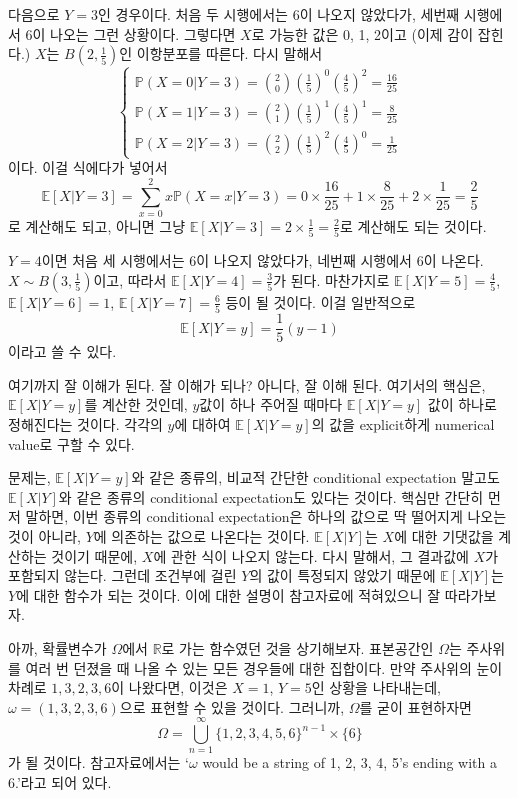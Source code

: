 \documentclass{article}
\begin{document}
다음으로 \(Y=3\)인 경우이다.
처음 두 시행에서는 6이 나오지 않았다가, 세번째 시행에서 6이 나오는 그런 상황이다.
그렇다면 \(X\)로 가능한 값은 0, 1, 2이고 (이제 감이 잡힌다.) \(X\)는 \(B(2,\frac15)\)인 이항분포를 따른다.
다시 말해서
\[\begin{cases}
\mathbb P(X=0|Y=3)=\binom20\left(\frac15\right)^0\left(\frac45\right)^2=\frac{16}{25}\\
\mathbb P(X=1|Y=3)=\binom21\left(\frac15\right)^1\left(\frac45\right)^1=\frac8{25}\\
\mathbb P(X=2|Y=3)=\binom22\left(\frac15\right)^2\left(\frac45\right)^0=\frac1{25}
\end{cases}\]
이다.
이걸 식에다가 넣어서
\[\mathbb E[X|Y=3]=\sum_{x=0}^2x\mathbb P(X=x|Y=3)=0\times\frac{16}{25}+1\times\frac8{25}+2\times\frac1{25}=\frac25\]
로 계산해도 되고, 아니면 그냥 \(\mathbb E[X|Y=3]=2\times\frac15=\frac25\)로 계산해도 되는 것이다.

\(Y=4\)이면 처음 세 시행에서는 6이 나오지 않았다가, 네번째 시행에서 6이 나온다.
\(X\sim B(3,\frac15)\)이고, 따라서 \(\mathbb E[X|Y=4]=\frac35\)가 된다.
마찬가지로 \(\mathbb E[X|Y=5]=\frac45\), \(\mathbb E[X|Y=6]=1\), \(\mathbb E[X|Y=7]=\frac65\) 등이 될 것이다.
이걸 일반적으로
\[\mathbb E[X|Y=y]=\frac15(y-1)\]
이라고 쓸 수 있다.

여기까지 잘 이해가 된다.
잘 이해가 되나?
아니다, 잘 이해 된다.
여기서의 핵심은, \(\mathbb E[X|Y=y]\)를 계산한 것인데, \(y\)값이 하나 주어질 때마다 \(\mathbb E[X|Y=y]\) 값이 하나로 정해진다는 것이다.
각각의 \(y\)에 대하여 \(\mathbb E[X|Y=y]\)의 값을 explicit하게 numerical value로 구할 수 있다.

문제는, \(\mathbb E[X|Y=y]\)와 같은 종류의, 비교적 간단한 conditional expectation 말고도 \(\mathbb E[X|Y]\)와 같은 종류의 conditional expectation도 있다는 것이다.
핵심만 간단히 먼저 말하면, 이번 종류의 conditional expectation은 하나의 값으로 딱 떨어지게 나오는 것이 아니라, \(Y\)에 의존하는 값으로 나온다는 것이다.
\(\mathbb E[X|Y]\)는 \(X\)에 대한 기댓값을 계산하는 것이기 때문에, \(X\)에 관한 식이 나오지 않는다.
다시 말해서, 그 결과값에 \(X\)가 포함되지 않는다.
그런데 조건부에 걸린 \(Y\)의 값이 특정되지 않았기 때문에 \(\mathbb E[X|Y]\)는 \(Y\)에 대한 함수가 되는 것이다.
이에 대한 설명이 참고자료에 적혀있으니 잘 따라가보자.

아까, 확률변수가 \(\Omega\)에서 \(\mathbb R\)로 가는 함수였던 것을 상기해보자.
표본공간인 \(\Omega\)는 주사위를 여러 번 던졌을 때 나올 수 있는 모든 경우들에 대한 집합이다.
만약 주사위의 눈이 차례로 \(1,3,2,3,6\)이 나왔다면, 이것은 \(X=1\), \(Y=5\)인 상황을 나타내는데, \(\omega=(1,3,2,3,6)\)으로 표현할 수 있을 것이다.
그러니까, \(\Omega\)를 굳이 표현하자면
\[\Omega=\bigcup_{n=1}^\infty\{1,2,3,4,5,6\}^{n-1}\times\{6\}\]
가 될 것이다.
참고자료에서는 `\(\omega\) would be a string of 1, 2, 3, 4, 5's ending with a 6.'라고 되어 있다.
\end{document}
